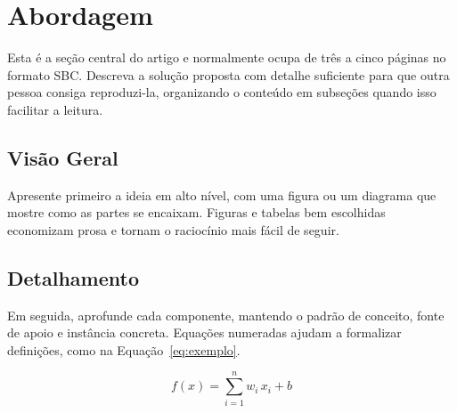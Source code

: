 \section{Abordagem}
\label{sec:abordagem}

Esta é a seção central do artigo e normalmente ocupa de três a cinco páginas no
formato SBC. Descreva a solução proposta com detalhe suficiente para que outra
pessoa consiga reproduzi-la, organizando o conteúdo em subseções quando isso
facilitar a leitura.

\subsection{Visão Geral}
\label{sec:abordagem:visao}

Apresente primeiro a ideia em alto nível, com uma figura ou um diagrama que
mostre como as partes se encaixam. Figuras e tabelas bem escolhidas economizam
prosa e tornam o raciocínio mais fácil de seguir.

\subsection{Detalhamento}
\label{sec:abordagem:detalhe}

Em seguida, aprofunde cada componente, mantendo o padrão de conceito, fonte de
apoio e instância concreta. Equações numeradas ajudam a formalizar definições,
como na Equação~\ref{eq:exemplo}.

\begin{equation}
  \label{eq:exemplo}
  f(x) = \sum_{i=1}^{n} w_i \, x_i + b
\end{equation}
